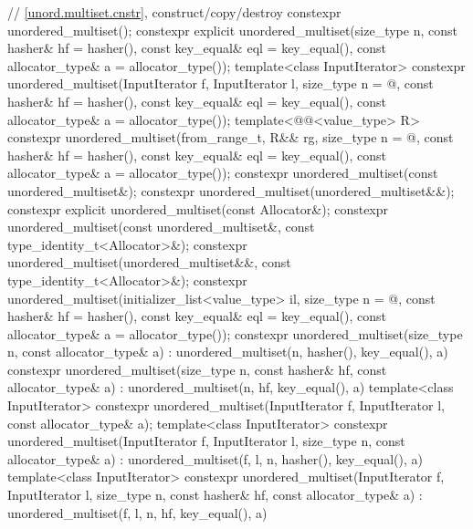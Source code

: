 \begin{codeblock}
{{    // \ref{unord.multiset.cnstr}, construct/copy/destroy
    constexpr unordered_multiset();
    constexpr explicit unordered_multiset(size_type n, const hasher& hf = hasher(),
                                          const key_equal& eql = key_equal(),
                                          const allocator_type& a = allocator_type());
    template<class InputIterator>
      constexpr unordered_multiset(InputIterator f, InputIterator l,
                                   size_type n = @\seebelow@, const hasher& hf = hasher(),
                                   const key_equal& eql = key_equal(),
                                   const allocator_type& a = allocator_type());
    template<@@<value_type> R>
      constexpr unordered_multiset(from_range_t, R&& rg,
                                   size_type n = @\seebelow@, const hasher& hf = hasher(),
                                   const key_equal& eql = key_equal(),
                                   const allocator_type& a = allocator_type());
    constexpr unordered_multiset(const unordered_multiset&);
    constexpr unordered_multiset(unordered_multiset&&);
    constexpr explicit unordered_multiset(const Allocator&);
    constexpr unordered_multiset(const unordered_multiset&, const type_identity_t<Allocator>&);
    constexpr unordered_multiset(unordered_multiset&&, const type_identity_t<Allocator>&);
    constexpr unordered_multiset(initializer_list<value_type> il,
                                 size_type n = @\seebelow@, const hasher& hf = hasher(),
                                 const key_equal& eql = key_equal(),
                                 const allocator_type& a = allocator_type());
    constexpr unordered_multiset(size_type n, const allocator_type& a)
      : unordered_multiset(n, hasher(), key_equal(), a) { }
    constexpr unordered_multiset(size_type n, const hasher& hf, const allocator_type& a)
      : unordered_multiset(n, hf, key_equal(), a) { }
    template<class InputIterator>
      constexpr unordered_multiset(InputIterator f, InputIterator l, const allocator_type& a);
    template<class InputIterator>
      constexpr unordered_multiset(InputIterator f, InputIterator l, size_type n,
                                   const allocator_type& a)
        : unordered_multiset(f, l, n, hasher(), key_equal(), a) { }
    template<class InputIterator>
      constexpr unordered_multiset(InputIterator f, InputIterator l, size_type n,
                                   const hasher& hf, const allocator_type& a)
        : unordered_multiset(f, l, n, hf, key_equal(), a) { }
}}
\end{codeblock}
